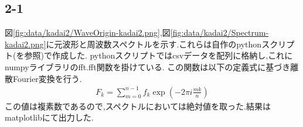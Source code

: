 \subsection*{2-1}
図\ref{fig:data/kadai2/WaveOrigin-kadai2.png},図\ref{fig:data/kadai2/Spectrum-kadai2.png}に元波形と周波数スペクトルを示す.これらは自作のpythonスクリプト(を参照)で作成した.
pythonスクリプトではcsvデータを配列に格納し,これにnumpyライブラリのfft.fft関数を掛けている.
この関数は以下の定義式に基づき離散Fourier変換を行う.\cite{Discrete33:online}
\begin{align*}
  F_k=\sum_{m=0}^{n-1}f_k\exp\left(-2\pi i\frac{mk}{n}\right)
\end{align*}
この値は複素数であるので,スペクトルにおいては絶対値を取った.結果はmatplotlibにて出力した.
